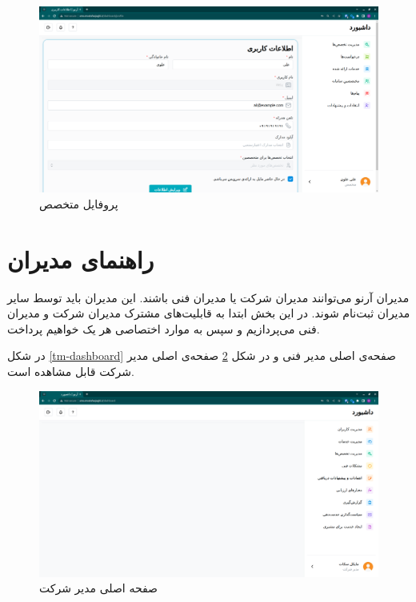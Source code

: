 \begin{figure}[h]
	\centering
	\includegraphics[width=\textwidth]{figs/user-guide/specialist-profile}
	\caption{پروفایل متخصص}
	\label{specialist-profile}
\end{figure}


\FloatBarrier
\section{راهنمای مدیران}

مدیران آرنو می‌توانند مدیران شرکت یا مدیران فنی باشند.
این مدیران باید توسط سایر مدیران ثبت‌نام شوند. 
در این بخش ابتدا به قابلیت‌های مشترک مدیران شرکت و مدیران فنی می‌پردازیم و سپس به موارد اختصاصی هر یک خواهیم پرداخت.

در شکل \ref{tm-dashboard} صفحه‌ی اصلی مدیر فنی و در شکل \ref{cm-dashboard} صفحه‌ی اصلی مدیر شرکت قابل مشاهده است.

\begin{figure}[h]
	\centering
	\includegraphics[width=\textwidth]{figs/user-guide/cm-dashboard}
	\caption{صفحه اصلی مدیر شرکت}
	\label{cm-dashboard}
\end{figure}

